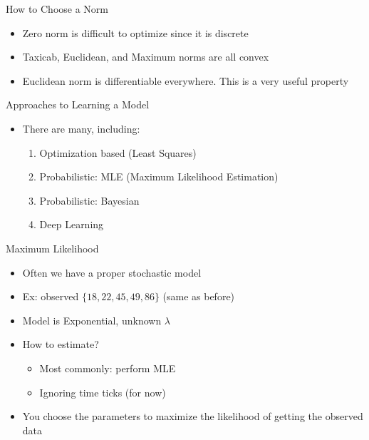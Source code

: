 \documentclass[aspectratio=169]{beamer}
\begin{document}
\begin{frame}{How to Choose a Norm}

\begin{itemize}
\item Zero norm is difficult to optimize since it is discrete
\item Taxicab, Euclidean, and Maximum norms are all convex
\item Euclidean norm is differentiable everywhere. This is a very useful property

\end{itemize}
\end{frame}
\begin{frame}{Approaches to Learning a Model}

\begin{itemize}
\item There are many, including:
\begin{enumerate}
\item Optimization based (Least Squares)
\item Probabilistic: MLE (Maximum Likelihood Estimation)
\item Probabilistic: Bayesian
\item Deep Learning
\end{enumerate}
\end{itemize}
\end{frame}

\begin{frame}{Maximum Likelihood}

\begin{itemize}
\item Often we have a proper stochastic model
\item Ex: observed $\{18, 22, 45, 49, 86\}$ (same as before)
\item Model is Exponential, unknown $\lambda$
\item How to estimate? 
\begin{itemize}
\item Most commonly: perform MLE
\item Ignoring time ticks (for now)
\end{itemize}
\item You choose the parameters to maximize the likelihood of getting the observed data
\end{itemize}
\end{frame}
\end{document}
